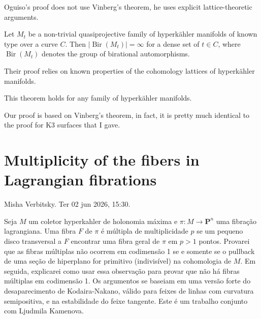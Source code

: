 \begin{remark}
\label{remark-oguiso-vinberg}
Oguiso's proof does not use Vinberg's theorem, he
uses explicit lattice-theoretic arguments.
\end{remark}

\begin{theorem}
\label{theorem-denisi-onorati-rizzo-viktorova}
Let $M_t$ be a non-trivial quasiprojective family
of hyperkähler manifolds of known type over a
curve $C$. Then $|\operatorname{Bir}(M_t)|=\infty$
for a dense set of $t \in C$, where
$\operatorname{Bir}(M_t)$ denotes the group of
birational automorphisms.
\end{theorem}

\begin{remark}
\label{remark-dorv-lattices}
Their proof relies on known properties of the
cohomology lattices of hyperkähler manifolds.
\end{remark}

\begin{theorem}
\label{theorem-amerik-soldatenkov-v}
This theorem holds for any family of hyperkähler
manifolds.
\end{theorem}

\begin{remark}
\label{remark-asv-vinberg}
Our proof is based on Vinberg's theorem, in fact,
it is pretty much identical to the proof for K3
surfaces that I gave.
\end{remark}

\section{Multiplicity of the fibers in
Lagrangian fibrations}
\label{section-multiplicity-fibers-
lagrangian-fibrations}

\noindent
Misha Verbitsky.
Ter 02 jun 2026, 15:30.

\medskip\noindent
Seja \(M\) um coletor hyperkahler de
holonomia m\'axima e
\(\pi : M \to \mathbf{P}^n\) uma fibração
lagrangiana. Uma fibra \(F\) de \(\pi\) \'
e m\'ultipla de multiplicidade \(p\) se um
pequeno disco transversal a \(F\) encontrar
uma fibra geral de \(\pi\) em \(p > 1\)
pontos. Provarei que as fibras m\'ultiplas
n\~ao ocorrem em codimens\~ao 1 se e
somente se o pullback de uma se\c{c}\~ao de
hiperplano for primitivo (indivis\'ivel) na
cohomologia de \(M\). Em seguida,
explicarei como usar essa observa\c{c}\~ao
para provar que n\~ao h\'a fibras m\'ultiplas
em codimens\~ao 1. Os argumentos se
baseiam em uma vers\~ao forte do
desaparecimento de Kodaira-Nakano, v\'alido
para feixes de linhas com curvatura
semipositiva, e na estabilidade do feixe
tangente. Este \'{e} um trabalho conjunto
com Ljudmila Kamenova.


